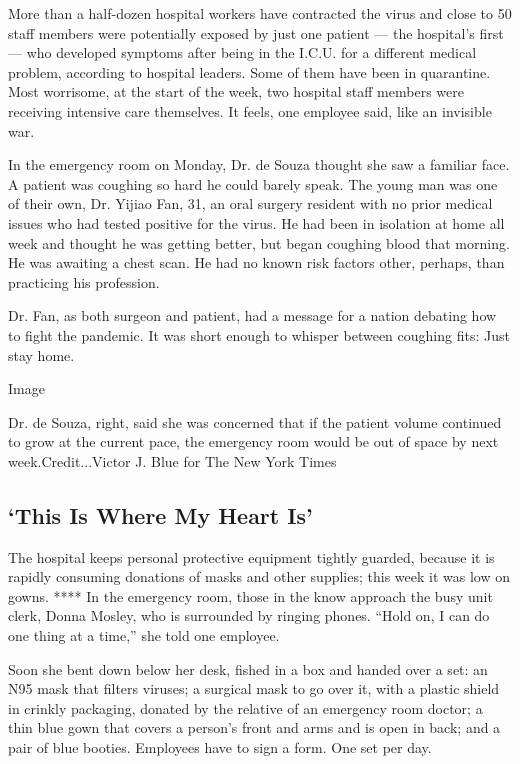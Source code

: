 More than a half-dozen hospital workers have contracted the virus and
close to 50 staff members were potentially exposed by just one patient
--- the hospital's first --- who developed symptoms after being in the
I.C.U. for a different medical problem, according to hospital leaders.
Some of them have been in quarantine. Most worrisome, at the start of
the week, two hospital staff members were receiving intensive care
themselves. It feels, one employee said, like an invisible war.

In the emergency room on Monday, Dr. de Souza thought she saw a familiar
face. A patient was coughing so hard he could barely speak. The young
man was one of their own, Dr. Yijiao Fan, 31, an oral surgery resident
with no prior medical issues who had tested positive for the virus. He
had been in isolation at home all week and thought he was getting
better, but began coughing blood that morning. He was awaiting a chest
scan. He had no known risk factors other, perhaps, than practicing his
profession.

Dr. Fan, as both surgeon and patient, had a message for a nation
debating how to fight the pandemic. It was short enough to whisper
between coughing fits: Just stay home.

Image

Dr. de Souza, right, said she was concerned that if the patient volume
continued to grow at the current pace, the emergency room would be out
of space by next week.Credit...Victor J. Blue for The New York Times

\hypertarget{this-is-where-my-heart-is}{%
\subsection{`This Is Where My Heart
Is'}\label{this-is-where-my-heart-is}}

The hospital keeps personal protective equipment tightly guarded,
because it is rapidly consuming donations of masks and other supplies;
this week it was low on gowns. **** In the emergency room, those in the
know approach the busy unit clerk, Donna Mosley, who is surrounded by
ringing phones. ``Hold on, I can do one thing at a time,'' she told one
employee.

Soon she bent down below her desk, fished in a box and handed over a
set: an N95 mask that filters viruses; a surgical mask to go over it,
with a plastic shield in crinkly packaging, donated by the relative of
an emergency room doctor; a thin blue gown that covers a person's front
and arms and is open in back; and a pair of blue booties. Employees have
to sign a form. One set per day.

